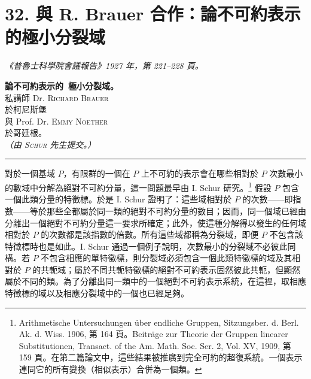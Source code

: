 \documentclass[11pt]{article}
\begin{document}
\setcounter{footnote}{0}

\section*{32. 與 R. Brauer 合作：論不可約表示的極小分裂域}
\emph{《普魯士科學院會議報告》1927 年，第 221--228 頁。}

\begin{center}
{\Large\bfseries 論不可約表示的\
極小分裂域。}\\[1.0em]
私講師 Dr. \textsc{Richard Brauer}\\
於柯尼斯堡\\
與 Prof. Dr. \textsc{Emmy Noether}\\
於哥廷根。\\[0.8em]
\emph{（由 \textsc{Schur} 先生提交。）}\\[0.5em]
\rule{4em}{0.4pt}
\end{center}

對於一個基域 $P$，有限群的一個在 $P$ 上不可約的表示會在哪些相對於 $P$ 次數最小的數域中分解為絕對不可約分量，這一問題最早由 I. Schur 研究。\footnote{Arithmetische Untersuchungen über endliche Gruppen, Sitzungsber. d. Berl. Ak. d. Wiss. 1906, 第 164 頁。Beiträge zur Theorie der Gruppen linearer Substitutionen, Transact. of the Am. Math. Soc. Ser. 2, Vol. XV, 1909, 第 159 頁。在第二篇論文中，這些結果被推廣到完全可約的超復系統。一個表示連同它的所有變換（相似表示）合併為一個類。} 假設 $P$ 包含一個此類分量的特徵標。於是 I. Schur 證明了：這些域相對於 $P$ 的次數——即指數——等於那些全都屬於同一類的絕對不可約分量的數目；因而，同一個域已經由分離出一個絕對不可約分量這一要求所確定；此外，使這種分解得以發生的任何域相對於 $P$ 的次數都是該指數的倍數。所有這些域都稱為分裂域，即便 $P$ 不包含該特徵標時也是如此。I. Schur 通過一個例子說明，次數最小的分裂域不必彼此同構。若 $P$ 不包含相應的單特徵標，則分裂域必須包含一個此類特徵標的域及其相對於 $P$ 的共軛域；屬於不同共軛特徵標的絕對不可約表示固然彼此共軛，但顯然屬於不同的類。為了分離出同一類中的一個絕對不可約表示系統，在這裡，取相應特徵標的域以及相應分裂域中的一個也已經足夠。
\end{document}
